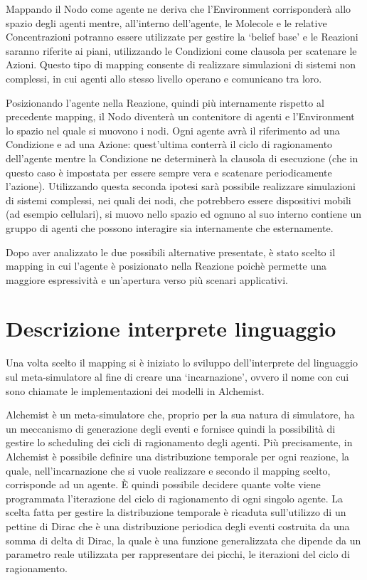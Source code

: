 Mappando il Nodo come agente ne deriva che l'Environment corrisponderà allo spazio degli agenti mentre, all'interno dell'agente, le Molecole e le relative Concentrazioni potranno essere utilizzate per gestire la `belief base' e le Reazioni saranno riferite ai piani, utilizzando le Condizioni come clausola per scatenare le Azioni. Questo tipo di mapping consente di realizzare simulazioni di sistemi non complessi, in cui agenti allo stesso livello operano e comunicano tra loro.

Posizionando l'agente nella Reazione, quindi più internamente rispetto al precedente mapping, il Nodo diventerà un contenitore di agenti e l'Environment lo spazio nel quale si muovono i nodi. Ogni agente avrà il riferimento ad una Condizione e ad una Azione: quest'ultima conterrà il ciclo di ragionamento dell'agente mentre la Condizione ne determinerà la clausola di esecuzione (che in questo caso è impostata per essere sempre vera e scatenare periodicamente l'azione). Utilizzando questa seconda ipotesi sarà possibile realizzare simulazioni di sistemi complessi, nei quali dei nodi, che potrebbero essere dispositivi mobili (ad esempio cellulari), si muovo nello spazio ed ognuno al suo interno contiene un gruppo di agenti che possono interagire sia internamente che esternamente.

Dopo aver analizzato le due possibili alternative presentate, è stato scelto il mapping in cui l'agente è posizionato nella Reazione poichè permette una maggiore espressività e un'apertura verso più scenari applicativi.

\section{Descrizione interprete linguaggio}\label{sctn:interpreteLinguaggio}
Una volta scelto il mapping si è iniziato lo sviluppo dell'interprete del linguaggio sul meta-simulatore al fine di creare una `incarnazione', ovvero il nome con cui sono chiamate le implementazioni dei modelli in Alchemist.

Alchemist è un meta-simulatore che, proprio per la sua natura di simulatore, ha un meccanismo di generazione degli eventi e fornisce quindi la possibilità di gestire lo scheduling dei cicli di ragionamento degli agenti. Più precisamente, in Alchemist è possibile definire una distribuzione temporale per ogni reazione, la quale, nell'incarnazione che si vuole realizzare e secondo il mapping scelto, corrisponde ad un agente. È quindi possibile decidere quante volte viene programmata l'iterazione del ciclo di ragionamento di ogni singolo agente. La scelta fatta per gestire la distribuzione temporale è ricaduta sull'utilizzo di un pettine di Dirac che è una distribuzione periodica degli eventi costruita da una somma di delta di Dirac, la quale è una funzione generalizzata che dipende da un parametro reale utilizzata per rappresentare dei picchi, le iterazioni del ciclo di ragionamento.

